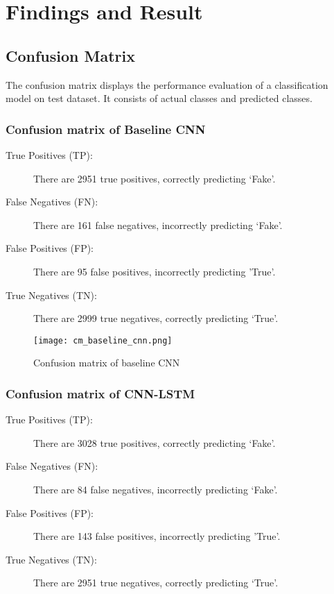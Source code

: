 \section{Findings and Result}

\subsection{Confusion Matrix}
The confusion matrix displays the performance evaluation of a classification model on test dataset. It consists of actual classes and predicted classes.

\subsubsection{Confusion matrix of Baseline CNN}

\begin{description}
    \item[True Positives (TP):] There are 2951 true positives, correctly predicting ‘Fake’.
    \item[False Negatives (FN):] There are 161 false negatives, incorrectly predicting ‘Fake’.
    \item[False Positives (FP):] There are 95 false positives, incorrectly predicting 'True'.
    \item[True Negatives (TN): ] There are 2999 true negatives, correctly predicting ‘True’.
\end{description}

\begin{figure}[h]
    \centering
    \texttt{[image: cm\_baseline\_cnn.png]}
    \caption{Confusion matrix of baseline CNN}    
\end{figure}

\subsubsection{Confusion matrix of CNN-LSTM}

\begin{description}
    \item[True Positives (TP):] There are 3028 true positives, correctly predicting ‘Fake’.
    \item[False Negatives (FN):] There are 84 false negatives, incorrectly predicting ‘Fake’.
    \item[False Positives (FP):] There are 143 false positives, incorrectly predicting 'True'.
    \item[True Negatives (TN): ] There are 2951 true negatives, correctly predicting ‘True’.
\end{description}

